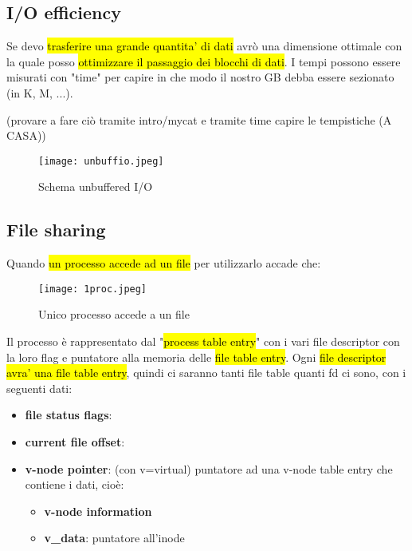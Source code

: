 \subsection{I/O efficiency}

Se devo \hl{trasferire una grande quantita' di dati} avrò una dimensione ottimale con la quale posso \hl{ottimizzare il passaggio dei blocchi di dati}. I tempi possono essere misurati con "time" per capire in che modo il nostro GB debba essere sezionato (in K, M, ...).

(provare a fare ciò tramite intro/mycat e tramite time capire le tempistiche (A CASA))

\begin{figure}[H]
\centering
\texttt{[image: unbuffio.jpeg]}
\caption{Schema unbuffered I/O} 
\label{unbuffio}
\end{figure}


\subsection{File sharing}

Quando \hl{un processo accede ad un file} per utilizzarlo accade che:


\begin{figure}[H]
\centering
\texttt{[image: 1proc.jpeg]}
\caption{Unico processo accede a un file} 
\label{1proc}
\end{figure}


Il processo è rappresentato dal "\hl{process table entry}" con i vari file descriptor con la loro flag e puntatore alla memoria delle \hl{file table entry}. Ogni \hl{file descriptor avra' una file table entry}, quindi ci saranno tanti file table quanti fd ci sono, con i seguenti dati:

\begin{itemize}
	\item \textbf{file status flags}: 
	\item \textbf{current file offset}: 
	\item \textbf{v-node pointer}: (con v=virtual) puntatore ad una v-node table entry che contiene i dati, cioè:
		\begin{itemize}
			\item \textbf{v-node information}
			\item \textbf{v\_data}: puntatore all'inode
		\end{itemize}
\end{itemize}


